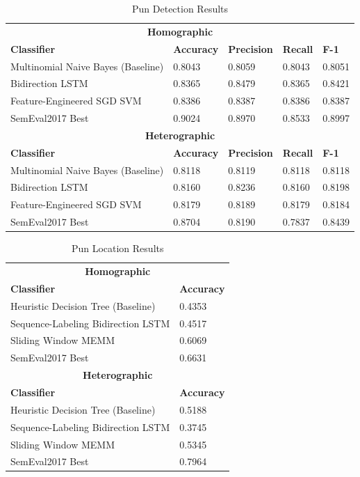 \documentclass{article}
\begin{document}
\begin{table}
\caption{Pun Detection Results}\label{tab:pun_detection_results}
\begin{center}
\begin{tabular}{l l l l l} 
\toprule
\multicolumn{5}{c}{\textbf{Homographic}}\\
\textbf{Classifier}					& \textbf{Accuracy}	& \textbf{Precision}	& \textbf{Recall}	& \textbf{F-1}\\
Multinomial Naive Bayes (Baseline)	& 0.8043			& 0.8059				& 0.8043			& 0.8051\\
Bidirection LSTM					& 0.8365			& 0.8479				& 0.8365			& 0.8421\\
Feature-Engineered SGD SVM			& 0.8386			& 0.8387				& 0.8386			& 0.8387\\
SemEval2017 Best					& 0.9024			& 0.8970				& 0.8533			& 0.8997\\
\midrule
\multicolumn{5}{c}{\textbf{Heterographic}}\\
\textbf{Classifier}					& \textbf{Accuracy}	& \textbf{Precision}	& \textbf{Recall}	& \textbf{F-1}\\
Multinomial Naive Bayes (Baseline)	& 0.8118			&  0.8119				& 0.8118			& 0.8118\\
Bidirection LSTM					& 0.8160			& 0.8236				& 0.8160			& 0.8198\\
Feature-Engineered SGD SVM			& 0.8179			& 0.8189				& 0.8179			& 0.8184\\
SemEval2017 Best					& 0.8704			& 0.8190				& 0.7837			& 0.8439\\
\bottomrule
\end{tabular}
\end{center}
\end{table}

\begin{table}
\caption{Pun Location Results}\label{tab:pun_location_results}
\begin{center}
\begin{tabular}{l l} 
\toprule
\multicolumn{2}{c}{\textbf{Homographic}}\\
\textbf{Classifier}					& \textbf{Accuracy}\\
Heuristic Decision Tree (Baseline)	& 0.4353\\
Sequence-Labeling Bidirection LSTM	& 0.4517\\
Sliding Window MEMM					& 0.6069\\
SemEval2017 Best					& 0.6631\\
\midrule
\multicolumn{2}{c}{\textbf{Heterographic}}\\
\textbf{Classifier}					& \textbf{Accuracy}\\
Heuristic Decision Tree (Baseline)	& 0.5188\\
Sequence-Labeling Bidirection LSTM	& 0.3745\\
Sliding Window MEMM					& 0.5345\\
SemEval2017 Best					& 0.7964\\
\bottomrule
\end{tabular}
\end{center}
\end{table}
\end{document}
